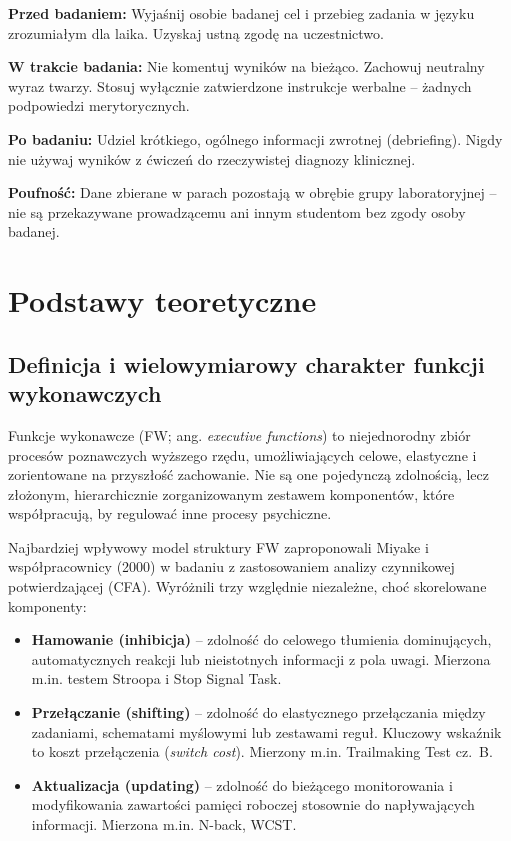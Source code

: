\documentclass[11pt,a4paper]{article}
\begin{document}
\begin{tcolorbox}[ethicsbox, title={\quad Ważne zasady etyczne obowiązujące podczas badania}]
\textbf{Przed badaniem:} Wyjaśnij osobie badanej cel i przebieg zadania w języku zrozumiałym dla laika. Uzyskaj ustną zgodę na uczestnictwo.

\textbf{W trakcie badania:} Nie komentuj wyników na bieżąco. Zachowuj neutralny wyraz twarzy. Stosuj wyłącznie zatwierdzone instrukcje werbalne -- żadnych podpowiedzi merytorycznych.

\textbf{Po badaniu:} Udziel krótkiego, ogólnego informacji zwrotnej (debriefing). Nigdy nie używaj wyników z ćwiczeń do rzeczywistej diagnozy klinicznej.

\textbf{Poufność:} Dane zbierane w parach pozostają w obrębie grupy laboratoryjnej -- nie są przekazywane prowadzącemu ani innym studentom bez zgody osoby badanej.
\end{tcolorbox}

\section{Podstawy teoretyczne}

\subsection{Definicja i wielowymiarowy charakter funkcji wykonawczych}

Funkcje wykonawcze (FW; ang. \textit{executive functions}) to niejednorodny zbiór procesów poznawczych wyższego rzędu, umożliwiających celowe, elastyczne i zorientowane na przyszłość zachowanie. Nie są one pojedynczą zdolnością, lecz złożonym, hierarchicznie zorganizowanym zestawem komponentów, które współpracują, by regulować inne procesy psychiczne.

Najbardziej wpływowy model struktury FW zaproponowali Miyake i współpracownicy (2000) w badaniu z zastosowaniem analizy czynnikowej potwierdzającej (CFA). Wyróżnili trzy względnie niezależne, choć skorelowane komponenty:

\begin{itemize}
    \item \textbf{Hamowanie (inhibicja)} -- zdolność do celowego tłumienia dominujących, automatycznych reakcji lub nieistotnych informacji z pola uwagi. Mierzona m.in. testem Stroopa i Stop Signal Task.
    \item \textbf{Przełączanie (shifting)} -- zdolność do elastycznego przełączania między zadaniami, schematami myślowymi lub zestawami reguł. Kluczowy wskaźnik to koszt przełączenia (\textit{switch cost}). Mierzony m.in. Trailmaking Test cz.~B.
    \item \textbf{Aktualizacja (updating)} -- zdolność do bieżącego monitorowania i modyfikowania zawartości pamięci roboczej stosownie do napływających informacji. Mierzona m.in. N-back, WCST.
\end{itemize}
\end{document}
